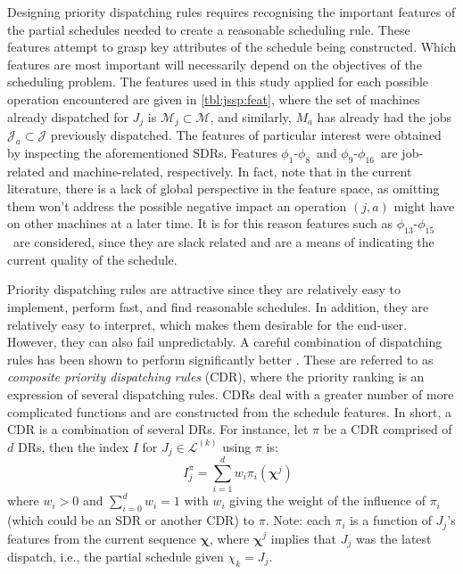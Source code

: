 \documentclass[twocolumn]{svjour3}
\newcommand{\vchi}{\bm \chi}
\newcommand{\dr}{dispatching rule}
\newcommand{\cdr}{composite priority \dr}
\newcommand{\phiproc}{$\phi_1$}
\newcommand{\phijobOps}{$\phi_8$}
\newcommand{\phiJobRelated}{\phiproc\!-\phijobOps}
\newcommand{\phimacFree}{$\phi_{9}$}
\newcommand{\phireducedSlack}{$\phi_{13}$}
\newcommand{\phiallSlack}{$\phi_{15}$}
\newcommand{\phiSlackRelated}{\phireducedSlack\!-\phiallSlack}
\newcommand{\phimakespan}{$\phi_{16}$}
\newcommand{\phiMacRelated}{\phimacFree\!-\phimakespan}
\begin{document}
Designing priority \dr s requires recognising the important features of the 
partial schedules needed to create a reasonable scheduling rule. 
These features attempt to grasp key attributes of the schedule being 
constructed. Which features are most important will necessarily depend on the
objectives of the scheduling problem. 
The features used in this study applied for each possible operation encountered 
are given in \cref{tbl:jssp:feat}, where the set of machines already dispatched 
for $J_j$ is $\mathcal{M}_j\subset\mathcal{M}$, and similarly, $M_a$ has 
already had the jobs $\mathcal{J}_a\subset\mathcal{J}$ previously dispatched.
The features of particular interest were obtained by inspecting the 
aforementioned SDRs. Features \phiJobRelated\ and \phiMacRelated\ are 
job-related and machine-related, respectively.
In fact, \cite{Pickardt2013} note that in the current literature, there is a 
lack of global perspective in the feature space, as omitting them won't 
address the possible negative impact an operation $(j,a)$ might have on other 
machines at a later time. It is for this reason features such as 
\phiSlackRelated\ are considered, since they are slack related and are a means 
of indicating the current quality of the schedule.

Priority \dr s are attractive since they are relatively easy to 
implement, perform fast, and find reasonable schedules. In addition, they are 
relatively easy to interpret, which makes them desirable for the end-user.
However, they can also fail unpredictably. 
A careful combination of \dr s has been shown to perform significantly better 
\cite{Jayamohan04}. These are referred to as \emph{\cdr s} 
(CDR), where the priority ranking is an expression of several \dr s. 
CDRs deal with a greater number of more complicated functions and are 
constructed from the schedule features. In short, a CDR is a combination 
of several DRs. 
For instance, let $\pi$ be a CDR comprised of $d$ DRs, then the index $I$ for 
$J_j\in\mathcal{L}^{(k)}$ using $\pi$ is:
\begin{equation}\quad I_j^{\pi} = \sum_{i=1}^d w_i \pi_i(\vchi^j) 
\label{eq:CDR}
\end{equation}
where $w_i>0$ and $\sum_{i=0}^d w_i = 1$ with $w_i$ giving the weight of the 
influence of $\pi_i$ (which could be an SDR or another CDR) to $\pi$. Note: 
each $\pi_i$ is a function of $J_j$'s features from the current sequence 
$\vchi$, where $\vchi^j$ implies that $J_j$ was the latest dispatch, i.e., the 
partial schedule given $\chi_k=J_j$.
\end{document}
